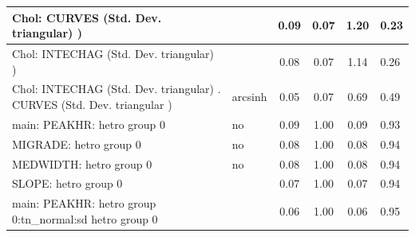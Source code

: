 \begin{table}
\begin{center}
\begin{tabular}{|l|l|c|c|c|l|}
			\hline
			 Chol: CURVES (Std. Dev. triangular) ) &  & 0.09 & 0.07 & 1.20 & 0.23 \\
			\hline
			 Chol: INTECHAG (Std. Dev. triangular) ) &  & 0.08 & 0.07 & 1.14 & 0.26 \\
			\hline
			 Chol: INTECHAG (Std. Dev. triangular) . CURVES (Std. Dev.   triangular ) & arcsinh & 0.05 & 0.07 & 0.69 & 0.49 \\
			\hline
			main: PEAKHR: hetro group 0 & no & 0.09 & 1.00 & 0.09 & 0.93 \\
			\hline
			MIGRADE: hetro group 0 & no & 0.08 & 1.00 & 0.08 & 0.94 \\
			\hline
			MEDWIDTH: hetro group 0 & no & 0.08 & 1.00 & 0.08 & 0.94 \\
			\hline
			SLOPE: hetro group 0 &  & 0.07 & 1.00 & 0.07 & 0.94 \\
			\hline
			main: PEAKHR: hetro group 0:tn_normal:sd  hetro group 0 &  & 0.06 & 1.00 & 0.06 & 0.95 \\
			\hline
		\end{tabular}
	\end{center}
\end{table}